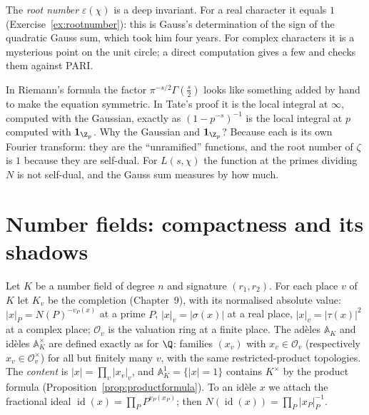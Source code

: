 The \emph{root number} $\varepsilon(\chi)$ is a deep invariant. For a real character it equals $1$ (Exercise~\ref{ex:rootnumber}): this is Gauss's
determination of the sign of the quadratic Gauss sum, which took him four years. For complex characters it is a mysterious point on the
unit circle; a direct computation gives a few and checks them against PARI.

\begin{think}
In Riemann's formula the factor $\pi^{-s/2}\Gamma(\frac s2)$ looks like something added by hand to make the equation symmetric. In Tate's proof
it is the local integral at $\infty$, computed with the Gaussian, exactly as $(1-p^{-s})^{-1}$ is the local integral at $p$ computed with
$\mathbf 1_{\Z_p}$. Why the Gaussian and $\mathbf 1_{\Z_p}$? Because each is its own Fourier transform: they are the ``unramified'' functions, and
the root number of $\zeta$ is $1$ because they are self-dual. For $L(s,\chi)$ the function at the primes dividing $N$ is not self-dual, and the
Gauss sum measures by how much.
\end{think}

\section{Number fields: compactness and its shadows}

Let $K$ be a number field of degree $n$ and signature $(r_1,r_2)$. For each place $v$ of $K$ let $K_v$ be the completion (Chapter~9), with its
normalised absolute value: $|x|_P=N(P)^{-v_P(x)}$ at a prime $P$, $|x|_v=|\sigma(x)|$ at a real place, $|x|_v=|\tau(x)|^2$ at a complex place;
$\mathcal O_v$ is the valuation ring at a finite place. The ad\`eles $\mathbb{A}_K$ and id\`eles $\mathbb{A}_K^\times$ are defined exactly as for $\Q$: families
$(x_v)$ with $x_v\in\mathcal O_v$ (respectively $x_v\in\mathcal O_v^\times$) for all but finitely many $v$, with the same restricted-product topologies.
The \emph{content} is $|x|=\prod_v|x_v|_v$, and $\mathbb{A}_K^1=\{|x|=1\}$ contains $K^\times$ by the product formula
(Proposition~\ref{prop:productformula}). To an id\`ele $x$ we attach the fractional ideal $\operatorname{id}(x)=\prod_PP^{v_P(x_P)}$; then
$N(\operatorname{id}(x))=\prod_P|x_P|_P^{-1}$.

